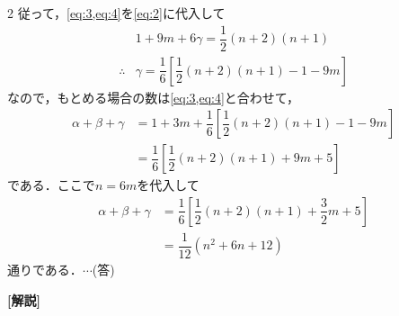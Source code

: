 \documentclass[../../main.tex]{subfiles}
\begin{document}
\begin{multicols}{2}
  従って，\cref{eq:3,eq:4}を\cref{eq:2}に代入して
  \begin{align}
    & 1 + 9m + 6\gamma = \dfrac{1}{2}(n+2)(n+1)                           \\
    \therefore
    & \gamma = \dfrac{1}{6} \left[ \dfrac{1}{2}(n+2)(n+1) - 1 - 9m \right]
  \end{align}
  なので，もとめる場合の数は\cref{eq:3,eq:4}と合わせて，
  \begin{align}
    \alpha+\beta+\gamma
    & = 1+3m+ \dfrac{1}{6}\left[\dfrac{1}{2}(n+2)(n+1) - 1 - 9m \right] \\
    & = \dfrac{1}{6} \left[ \dfrac{1}{2}(n+2)(n+1) + 9m + 5 \right]
  \end{align}
  である．ここで$n=6m$を代入して
  \begin{align}
    \alpha+\beta+\gamma
    & = \dfrac{1}{6} \left[ \dfrac{1}{2}(n+2)(n+1) + \dfrac{3}{2}m + 5 \right] \\
    & = \dfrac{1}{12} \left(n^2+6n+12\right)
  \end{align}
  通りである．$\cdots$(答)

  {\bf [解説]}

  \newpage
\end{multicols}
\end{document}
